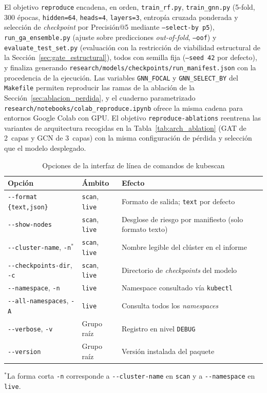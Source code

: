 El objetivo \texttt{reproduce} encadena, en orden, \texttt{train\_rf.py},
\texttt{train\_gnn.py} (5-fold, 300 épocas, \texttt{hidden=64},
\texttt{heads=4}, \texttt{layers=3}, entropía cruzada ponderada y selección de
\textit{checkpoint} por Precisión@5 mediante \texttt{--select-by p5}),
\texttt{run\_ga\_ensemble.py} (ajuste sobre predicciones \textit{out-of-fold},
\texttt{--oof}) y \texttt{evaluate\_test\_set.py} (evaluación con la
restricción de viabilidad estructural de la Sección~\ref{sec:gate_estructural}),
todos con semilla fija (\texttt{--seed 42} por defecto), y finaliza generando
\texttt{research/models/checkpoints/run\_manifest.json} con la procedencia de
la ejecución. Las variables \texttt{GNN\_FOCAL} y \texttt{GNN\_SELECT\_BY} del
\texttt{Makefile} permiten reproducir las ramas de la ablación de la
Sección~\ref{sec:ablacion_perdida}, y el cuaderno parametrizado
\texttt{research/notebooks/colab\_reproduce.ipynb} ofrece la misma cadena para
entornos Google Colab con GPU. El objetivo
\texttt{reproduce-ablations} reentrena las variantes de arquitectura recogidas
en la Tabla~\ref{tab:arch_ablation} (\ac{GAT} de 2~capas y \ac{GCN} de
3~capas) con la misma configuración de pérdida y selección que el modelo
desplegado.

\begin{table}[htbp]
\centering\small
\caption{Opciones de la interfaz de línea de comandos de kubescan}
\label{tab:cli_options}
\begin{tabularx}{\textwidth}{@{}>{\hsize}L>{\hsize}L>{\hsize}L@{}}
\toprule
Opción & Ámbito & Efecto \\
\midrule
\texttt{-{}-format \{text,json\}} & \texttt{scan}, \texttt{live} & Formato de salida; \texttt{text} por defecto \\
\texttt{-{}-show-nodes} & \texttt{scan}, \texttt{live} & Desglose de riesgo por manifiesto (solo formato texto) \\
\texttt{-{}-cluster-name}, \texttt{-n}\(^{*}\) & \texttt{scan}, \texttt{live} & Nombre legible del clúster en el informe \\
\texttt{-{}-checkpoints-dir}, \texttt{-c} & \texttt{scan}, \texttt{live} & Directorio de \textit{checkpoints} del modelo \\
\texttt{-{}-namespace}, \texttt{-n} & \texttt{live} & Namespace consultado vía \texttt{kubectl} \\
\texttt{-{}-all-namespaces}, \texttt{-A} & \texttt{live} & Consulta todos los \textit{namespaces} \\
\texttt{-{}-verbose}, \texttt{-v} & Grupo raíz & Registro en nivel \texttt{DEBUG} \\
\texttt{-{}-version} & Grupo raíz & Versión instalada del paquete \\
\bottomrule
\end{tabularx}

{\footnotesize\(^{*}\)La forma corta \texttt{-n} corresponde a
\texttt{-{}-cluster-name} en \texttt{scan} y a \texttt{-{}-namespace} en
\texttt{live}.\par}
\fuentepropia
\end{table}
